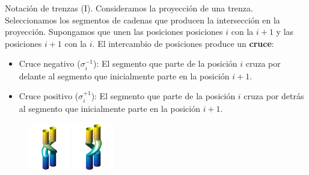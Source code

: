 \documentclass{beamer}
\begin{document}
\begin{frame}{Notación de trenzas (I).}
	Consideramos la proyección de una trenza. \\
	Seleccionamos los segmentos de cadenas que producen la intersección en la proyección. Supongamos que unen las posiciones posiciones $i$ con la $i+1$ y las posiciones $i+1$ con la $i$.
	El intercambio de posiciones produce un \textbf{cruce}:
	\begin{itemize}
		\item Cruce negativo ($\sigma_{i}^{-1}$): El segmento que parte de la posición $i$ cruza por delante al segmento que inicialmente parte en la posición $i+1$.
		\item Cruce positivo ($\sigma_{i}^{+1}$): El segmento que parte de la posición $i$ cruza por detrás al segmento que inicialmente parte en la posición $i+1$.
	\end{itemize}
	\begin{figure}[h!]
		\includegraphics[width=1.8cm]{imagenes/t5.png}
	    \includegraphics[width=1.8cm]{imagenes/t6.png}
	\end{figure}

\end{frame}
\end{document}
